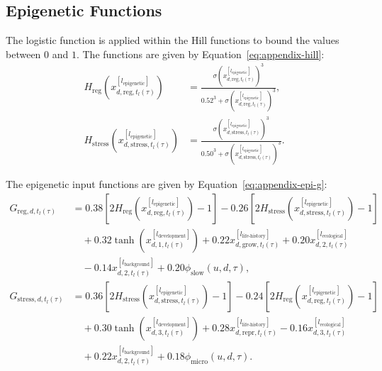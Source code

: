 \documentclass[11pt]{article}
\begin{document}
\subsection{Epigenetic Functions}
The logistic function is applied within the Hill functions to bound the values between $0$ and $1$. The functions are given by Equation~\ref{eq:appendix-hill}:
\begin{equation}
\begin{aligned}
H_{\mathrm{reg}}\!\left(
x^{[l_{\mathrm{epigenetic}}]}_{d,\mathrm{reg},t_l(\tau)}
\right)
&=
\frac{
\sigma\!\left(
x^{[l_{\mathrm{epigenetic}}]}_{d,\mathrm{reg},t_l(\tau)}
\right)^3
}{
0.52^3+
\sigma\!\left(
x^{[l_{\mathrm{epigenetic}}]}_{d,\mathrm{reg},t_l(\tau)}
\right)^3
},\\
H_{\mathrm{stress}}\!\left(
x^{[l_{\mathrm{epigenetic}}]}_{d,\mathrm{stress},t_l(\tau)}
\right)
&=
\frac{
\sigma\!\left(
x^{[l_{\mathrm{epigenetic}}]}_{d,\mathrm{stress},t_l(\tau)}
\right)^3
}{
0.50^3+
\sigma\!\left(
x^{[l_{\mathrm{epigenetic}}]}_{d,\mathrm{stress},t_l(\tau)}
\right)^3
}.
\end{aligned}
\label{eq:appendix-hill}
\end{equation}

The epigenetic input functions are given by Equation~\ref{eq:appendix-epi-g}:
\begin{equation}
\begin{aligned}
G_{\mathrm{reg},d,t_l(\tau)}
&=
0.38\left[
2H_{\mathrm{reg}}\!\left(
x^{[l_{\mathrm{epigenetic}}]}_{d,\mathrm{reg},t_l(\tau)}
\right)-1
\right]
-
0.26\left[
2H_{\mathrm{stress}}\!\left(
x^{[l_{\mathrm{epigenetic}}]}_{d,\mathrm{stress},t_l(\tau)}
\right)-1
\right]\\
&\quad+
0.32\tanh\!\left(
x^{[l_{\mathrm{development}}]}_{d,1,t_l(\tau)}
\right)
+
0.22x^{[l_{\mathrm{life\text{-}history}}]}_{d,\mathrm{grow},t_l(\tau)}
+
0.20x^{[l_{\mathrm{ecological}}]}_{d,2,t_l(\tau)}\\
&\quad-
0.14x^{[l_{\mathrm{background}}]}_{d,2,t_l(\tau)}
+
0.20\phi_{\mathrm{slow}}(u,d,\tau),\\
G_{\mathrm{stress},d,t_l(\tau)}
&=
0.36\left[
2H_{\mathrm{stress}}\!\left(
x^{[l_{\mathrm{epigenetic}}]}_{d,\mathrm{stress},t_l(\tau)}
\right)-1
\right]
-
0.24\left[
2H_{\mathrm{reg}}\!\left(
x^{[l_{\mathrm{epigenetic}}]}_{d,\mathrm{reg},t_l(\tau)}
\right)-1
\right]\\
&\quad+
0.30\tanh\!\left(
x^{[l_{\mathrm{development}}]}_{d,3,t_l(\tau)}
\right)
+
0.28x^{[l_{\mathrm{life\text{-}history}}]}_{d,\mathrm{repr},t_l(\tau)}
-
0.16x^{[l_{\mathrm{ecological}}]}_{d,3,t_l(\tau)}\\
&\quad+
0.22x^{[l_{\mathrm{background}}]}_{d,2,t_l(\tau)}
+
0.18\phi_{\mathrm{micro}}(u,d,\tau).
\end{aligned}
\label{eq:appendix-epi-g}
\end{equation}
\end{document}
